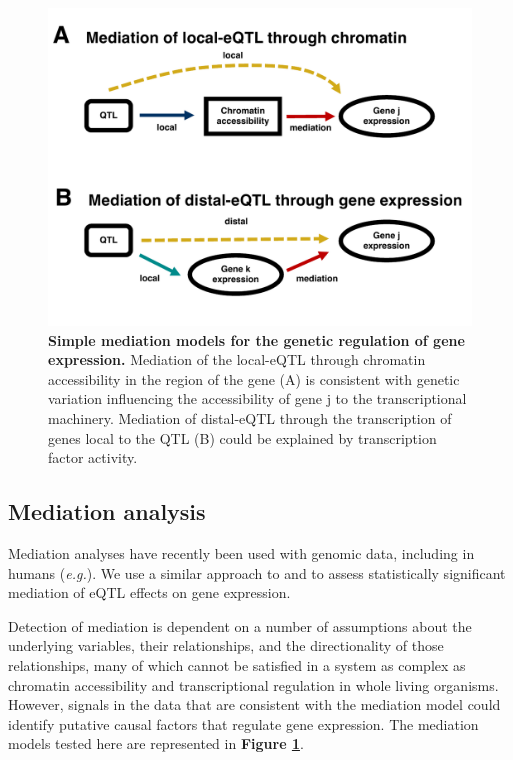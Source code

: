 \documentclass[9pt,twocolumn,twoside]{gsajnl}
\newcommand{\eg}{\emph{e.g.}\xspace}
\begin{document}
\begin{figure}[htbp]
\renewcommand{\familydefault}{\sfdefault}\normalfont
\centering
\includegraphics[width=\linewidth, clip, trim={0in 0.5in 0in 0in}]{figs/mediation_graph.pdf}
\caption{\textbf{Simple mediation models for the genetic regulation of gene expression.} Mediation of the local-eQTL through chromatin accessibility in the region of the gene (A) is consistent with genetic variation influencing the accessibility of gene j to the transcriptional machinery. Mediation of distal-eQTL through the transcription of genes local to the QTL (B) could be explained by transcription factor activity. 
\label{fig:graph}}
\end{figure}

\subsection{Mediation analysis}

Mediation analyses have recently been used with genomic data, including in humans (\eg \citealt{Battle2014}). We use a similar approach to \cite{Chick2016} and \cite{Keller2018} to assess statistically significant mediation of eQTL effects on gene expression.

Detection of mediation is dependent on a number of assumptions about the underlying variables, their relationships, and the directionality of those relationships, many of which cannot be satisfied in a system as complex as chromatin accessibility and transcriptional regulation in whole living organisms. However, signals in the data that are consistent with the mediation model could identify putative causal factors that regulate gene expression. The mediation models tested here are represented in \textbf{Figure \ref{fig:graph}}.
\end{document}
